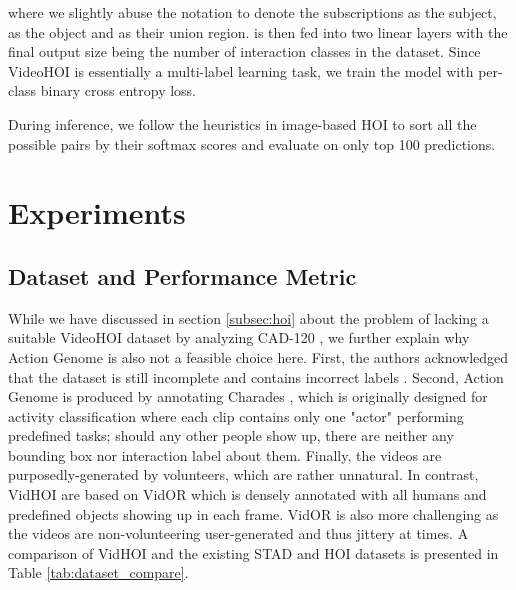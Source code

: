 \documentclass[sigconf]{acmart}
\begin{document}
where we slightly abuse the notation to denote the subscriptions  as the subject,  as the object and  as their union region.
 is then fed into two linear layers with the final output size being the number of interaction classes in the dataset.
Since VideoHOI is essentially a multi-label learning task, we train the model with per-class binary cross entropy loss.

During inference, we follow the heuristics in image-based HOI \cite{chao2018learning} to sort all the possible pairs by their softmax scores and evaluate on only top 100 predictions.



\section{Experiments}
\label{sec:experiments}

\subsection{Dataset and Performance Metric}
\label{subsec:dataset}

While we have discussed in section \ref{subsec:hoi} about the problem of lacking a suitable VideoHOI dataset by analyzing CAD-120 \cite{koppula2013learning}, we further explain why Action Genome \cite{ji2020action} is also not a feasible choice here.
First, the authors acknowledged that the dataset is still incomplete and contains incorrect labels \cite{ji_2020}.
Second, Action Genome is produced by annotating Charades \cite{sigurdsson2016hollywood}, which is originally designed for activity classification where each clip contains only one "actor" performing predefined tasks; should any other people show up, there are neither any bounding box nor interaction label about them.
Finally, the videos are purposedly-generated by volunteers, which are rather unnatural. 
In contrast, VidHOI are based on VidOR \cite{shang2019annotating} which is densely annotated with all humans and predefined objects showing up in each frame.
VidOR is also more challenging as the videos are non-volunteering user-generated and thus jittery at times.
A comparison of VidHOI and the existing STAD and HOI datasets is presented in Table \ref{tab:dataset_compare}.
\end{document}
